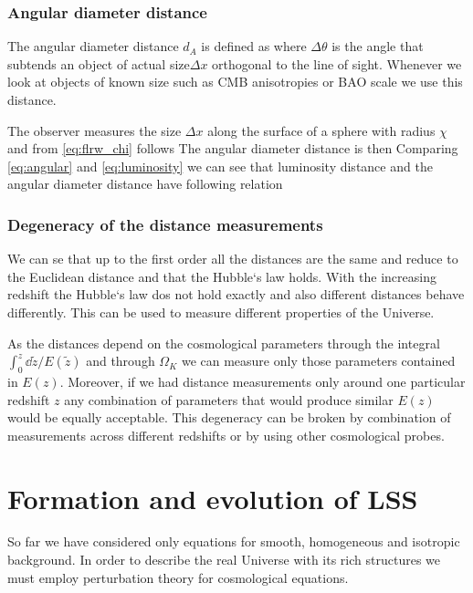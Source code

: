 \subsubsection{Angular diameter distance}
The angular diameter distance $d_A$ is defined as
where $\Delta\theta$ is the angle that subtends an object of actual size$\Delta x$ orthogonal to the line of sight. Whenever we look at objects of known size such as CMB anisotropies or BAO scale we use this distance.

The observer measures the size $\Delta x$ along the surface of a sphere with radius $\chi$ and from \autoref{eq:flrw_chi} follows
The angular diameter distance is then
Comparing \autoref{eq:angular} and \autoref{eq:luminosity} we can see that luminosity distance and the angular diameter distance have following relation
\subsubsection{Degeneracy of the distance measurements}
We can se that up to the first order all the distances are the same and reduce to the Euclidean distance and that the Hubble`s law holds. With the increasing redshift the Hubble`s law dos not hold exactly and also different distances behave differently. This can be used to measure different properties of the Universe.

As the distances depend on the cosmological parameters through the integral $\int_0^z{\dd\tilde z/E(\tilde z)}$ and through $\Omega_K$ we can measure only those parameters contained in $E(z)$. Moreover, if we had distance measurements only around one particular redshift $z$ any combination of parameters that would produce similar $E(z)$ would be equally acceptable. This degeneracy can be broken by combination of measurements across different redshifts or by using other cosmological probes.

\section{Formation and evolution of LSS}
So far we have considered only equations for smooth, homogeneous and isotropic background. In order to describe the real Universe with its rich structures we must employ perturbation theory for cosmological equations.
